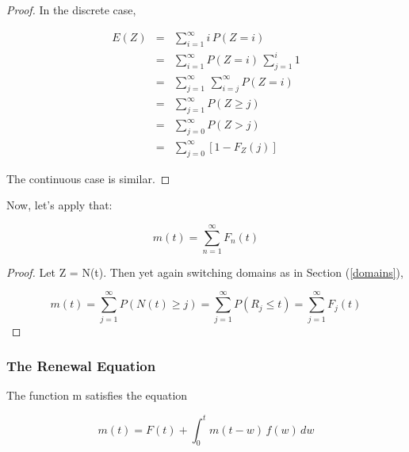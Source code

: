 \begin{proof}

In the discrete case,

\begin{eqnarray}
E(Z) & = & \sum ^{\infty }_{i=1}i\, P(Z=i) \\
 & = & \sum ^{\infty }_{i=1}P(Z=i)\, \sum ^{i}_{j=1}1\\
 & = & \sum ^{\infty }_{j=1}\, \sum ^{\infty }_{i=j}P(Z=i)\\
 & = & \sum ^{\infty }_{j=1} P(Z\geq j) \\
 & = & \sum ^{\infty }_{j=0} P(Z > j) \\
 & = & \sum ^{\infty }_{j=0} [1 - F_Z(j)]
\end{eqnarray}

The continuous case is similar.

\end{proof}

Now, let's apply that:

\begin{theorem}

\begin{equation}
\label{mfn}
m(t)=\sum ^{\infty }_{n=1}F_{n}(t)
\end{equation}

\end{theorem}

\begin{proof}

Let Z = N(t). Then yet again switching domains as in Section
(\ref{domains}),

\begin{equation}
m(t)=\sum ^{\infty }_{j=1}P(N(t)\geq j)=\sum ^{\infty
}_{j=1}P(R_{j}\leq t)=\sum ^{\infty }_{j=1}F_{j}(t)
\end{equation}

\end{proof}

\subsubsection{The Renewal Equation}

\begin{theorem}

The function m satisfies the equation

\begin{equation}
\label{reneweqn}
m(t) = F(t)+\int _{0}^{t}m(t-w)\, f(w)\, dw
\end{equation}

\end{theorem}

